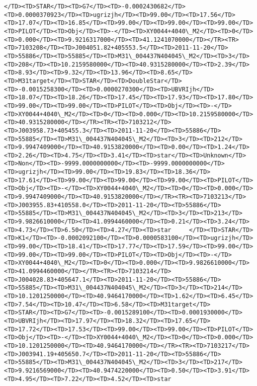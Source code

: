 \documentclass[11pt]{article}
\begin{document}
\begin{Verbatim}[commandchars=\\\{\}]
</TD><TD>STAR</TD><TD>G7</TD><TD>-0.0002430682</TD><TD>0.0000370923</TD><TD>ugrizjh</TD><TD>99.00</TD><TD>17.56</TD><TD>17.07</TD><TD>16.85</TD><TD>99.00</TD><TD>99.00</TD><TD>99.00</TD><TD>PILOT</TD><TD>Obj</TD><TD>-</TD><TD>XY0044+4040\_M2</TD><TD>0</TD><TD>0.000</TD><TD>9.9216317000</TD><TD>41.1241070000</TD></TR><TR><TD>7103208</TD><TD>J004051.82+405553.5</TD><TD>2011-11-20</TD><TD>55886</TD><TD>55885</TD><TD>M31\_004437N404045\_M2</TD><TD>3</TD><TD>208</TD><TD>10.2159580000</TD><TD>40.9315280000</TD><TD>2.39</TD><TD>8.93</TD><TD>9.32</TD><TD>13.96</TD><TD>8.65</TD><TD>M31target</TD><TD>STAR</TD><TD>DoubleStar</TD><TD>-0.0015258300</TD><TD>0.0000270300</TD><TD>UBVRIjh</TD><TD>18.07</TD><TD>18.26</TD><TD>17.45</TD><TD>17.93</TD><TD>17.80</TD><TD>99.00</TD><TD>99.00</TD><TD>PILOT</TD><TD>Obj</TD><TD>-</TD><TD>XY0044+4040\_M2</TD><TD>0</TD><TD>0.000</TD><TD>10.2159580000</TD><TD>40.9315280000</TD></TR><TR><TD>7103212</TD><TD>J003958.73+405455.3</TD><TD>2011-11-20</TD><TD>55886</TD><TD>55885</TD><TD>M31\_004437N404045\_M2</TD><TD>3</TD><TD>212</TD><TD>9.9947409000</TD><TD>40.9153820000</TD><TD>0.00</TD><TD>1.24</TD><TD>2.26</TD><TD>4.75</TD><TD>3.41</TD><TD>star</TD><TD>Unknown</TD><TD>Non</TD><TD>-9999.0000000000</TD><TD>-9999.0000000000</TD><TD>ugrizjh</TD><TD>99.00</TD><TD>19.83</TD><TD>18.36</TD><TD>17.61</TD><TD>99.00</TD><TD>99.00</TD><TD>99.00</TD><TD>PILOT</TD><TD>Obj</TD><TD>-</TD><TD>XY0044+4040\_M2</TD><TD>0</TD><TD>0.000</TD><TD>9.9947409000</TD><TD>40.9153820000</TD></TR><TR><TD>7103213</TD><TD>J003955.83+410558.0</TD><TD>2011-11-20</TD><TD>55886</TD><TD>55885</TD><TD>M31\_004437N404045\_M2</TD><TD>3</TD><TD>213</TD><TD>9.9826610000</TD><TD>41.0994460000</TD><TD>0.21</TD><TD>3.24</TD><TD>4.73</TD><TD>6.50</TD><TD>4.27</TD><TD>star     </TD><TD>STAR</TD><TD>K1</TD><TD>-0.0002092100</TD><TD>0.0000583100</TD><TD>ugrizjh</TD><TD>99.00</TD><TD>18.41</TD><TD>17.77</TD><TD>17.59</TD><TD>99.00</TD><TD>99.00</TD><TD>99.00</TD><TD>PILOT</TD><TD>Obj</TD><TD>-</TD><TD>XY0044+4040\_M2</TD><TD>0</TD><TD>0.000</TD><TD>9.9826610000</TD><TD>41.0994460000</TD></TR><TR><TD>7103214</TD><TD>J004028.83+405647.1</TD><TD>2011-11-20</TD><TD>55886</TD><TD>55885</TD><TD>M31\_004437N404045\_M2</TD><TD>3</TD><TD>214</TD><TD>10.1201250000</TD><TD>40.9464170000</TD><TD>1.62</TD><TD>6.45</TD><TD>7.54</TD><TD>10.47</TD><TD>6.58</TD><TD>M31target</TD><TD>STAR</TD><TD>G7</TD><TD>-0.0015289100</TD><TD>0.0001930000</TD><TD>UBVRIjh</TD><TD>17.97</TD><TD>18.32</TD><TD>17.65</TD><TD>17.72</TD><TD>17.53</TD><TD>99.00</TD><TD>99.00</TD><TD>PILOT</TD><TD>Obj</TD><TD>-</TD><TD>XY0044+4040\_M2</TD><TD>0</TD><TD>0.000</TD><TD>10.1201250000</TD><TD>40.9464170000</TD></TR><TR><TD>7103217</TD><TD>J003941.19+405650.7</TD><TD>2011-11-20</TD><TD>55886</TD><TD>55885</TD><TD>M31\_004437N404045\_M2</TD><TD>3</TD><TD>217</TD><TD>9.9216569000</TD><TD>40.9474220000</TD><TD>0.50</TD><TD>3.91</TD><TD>4.95</TD><TD>7.22</TD><TD>4.52</TD><TD>star     
\end{Verbatim}
\end{document}
